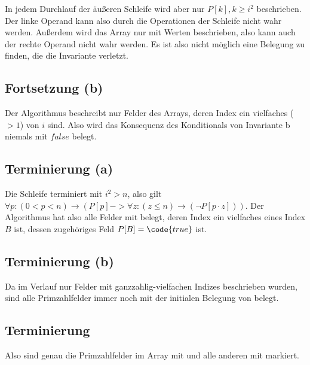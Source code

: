 \documentclass[parskip=half,a4paper]{scrartcl}
\begin{document}
In jedem Durchlauf der äußeren Schleife wird aber nur $P[k], k \ge i^2$ beschrieben. Der linke Operand kann also durch die Operationen der Schleife nicht wahr werden. Außerdem wird das Array nur mit  Werten beschrieben, also kann auch der rechte Operand nicht wahr werden. Es ist also nicht möglich eine Belegung zu finden, die die Invariante verletzt.

\subsection*{Fortsetzung (b)}

Der Algorithmus beschreibt nur Felder des Arrays, deren Index ein vielfaches ($>1$) von $i$ sind. Also wird das Konsequenz des Konditionals von Invariante b niemals mit $false$ belegt.

\subsection*{Terminierung (a)}

Die Schleife terminiert mit $i^2 > n$, also gilt $\forall p:\left( 0 < p < n\right) \rightarrow \left(P[p] -> \forall z: \left(z \le n\right) \rightarrow \left(\neg P[p \cdot z]\right)\right)$. Der Algorithmus hat also alle Felder mit  belegt, deren Index ein vielfaches eines Index $B$ ist, dessen zugehöriges Feld $P[B] = \code{true}$ ist.

\subsection*{Terminierung (b)}

Da im Verlauf nur Felder mit ganzzahlig-vielfachen Indizes beschrieben wurden, sind alle Primzahlfelder immer noch mit der initialen Belegung von 
belegt.

\subsection*{Terminierung}

Also sind genau die Primzahlfelder im Array mit  und alle anderen mit
 markiert.
\end{document}
